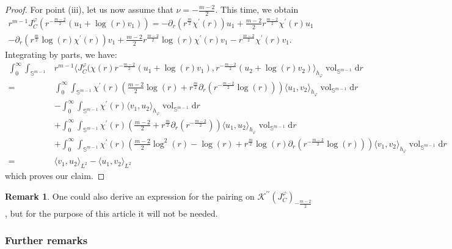 \documentclass{article}
\numberwithin{equation}{section}        %
\theoremstyle{bfnote}
\theoremstyle{definition}
\theoremstyle{bfremark}
\newtheorem{rem}[thm]{Remark}               %
\newcommand{\Sp}{\mathbb{S}}                %
\newcommand{\diff}{\mathrm{d}}                      %
\DeclareMathOperator{\vol}{vol}                 %
\begin{document}
\begin{proof}
    For point (iii), let us now assume that $\nu = - \tfrac{m-2}{2}$.  This time, we obtain
    \begin{multline*}
        r^{m-1} J^\varphi_C(r^{-\tfrac{m-2}{2}}(u_1 + \log(r) v_1)) = - \partial_r(r^{\tfrac{m}{2}}\chi^\prime(r))u_1 + \frac{m-2}{2} r^{\tfrac{m-2}{2}} \chi^\prime(r) u_1 \\ - \partial_r(r^{\tfrac{m}{2}} \log(r) \chi^\prime(r)) v_1 + \frac{m-2}{2} r^{\tfrac{m-2}{2}} \log(r) \chi^\prime(r) v_1 - r^{\tfrac{m-2}{2}} \chi^\prime(r) v_1 .
    \end{multline*}
    Integrating by parts, we have:
    \begin{align*}
        \int_0^\infty \int_{\Sp^{m-1}} & r^{m-1} \langle J^\varphi_C(\chi(r)r^{-\frac{m-2}{2}}(u_1 + \log(r) v_1), r^{-\frac{m-2}{2}}(u_2+\log(r)v_2) \rangle_{h_\varphi} \vol_{\Sp^{m-1}} \diff  r \\
            = & \int_0^\infty \int_{\Sp^{m-1}} \chi^\prime(r) (\tfrac{m-2}{2} \log(r) + r^{\frac{m}{2}} \partial_r(r^{-\frac{m-2}{2}} \log(r))) \langle u_1, v_2 \rangle_{h_\varphi} \vol_{\Sp^{m-1}} \diff  r \\
            & - \int_0^\infty \int_{\Sp^{m-1}} \chi^\prime(r) \langle v_1, u_2 \rangle_{h_\varphi} \vol_{\Sp^{m-1}} \diff  r \\
            & + \int_0^\infty \int_{\Sp^{m-1}} \chi^\prime(r) (\tfrac{m-2}{2} + r^{\frac{m}{2}} \partial_r(r^{-\frac{m-2}{2}})) \langle u_1, u_2 \rangle_{h_\varphi} \vol_{\Sp^{m-1}} \diff  r \\
            & + \int_0^\infty \int_{\Sp^{m-1}} \chi^\prime(r)(\tfrac{m-2}{2}\log^2(r)- \log(r) + r^{\frac{m}{2}} \log(r)  \partial_r (r^{-\frac{m-2}{2}} \log(r))) \langle v_1, v_2 \rangle_{h_\varphi} \vol_{\Sp^{m-1}} \diff  r \\
            = & \langle v_1, u_2 \rangle_{L^2} - \langle u_1, v_2 \rangle_{L^2}
    \end{align*}
    which proves our claim.
\end{proof}

\begin{rem}
    One could also derive an expression for the pairing on $\mathcal{K}^{\prime\prime}(J^\varphi_C)_{-\tfrac{m-2}{2}}$, but for the purpose of this article it will not be needed.
\end{rem}


    \subsubsection{Further remarks}     \label{subsubsec: further remarks}
\end{document}
